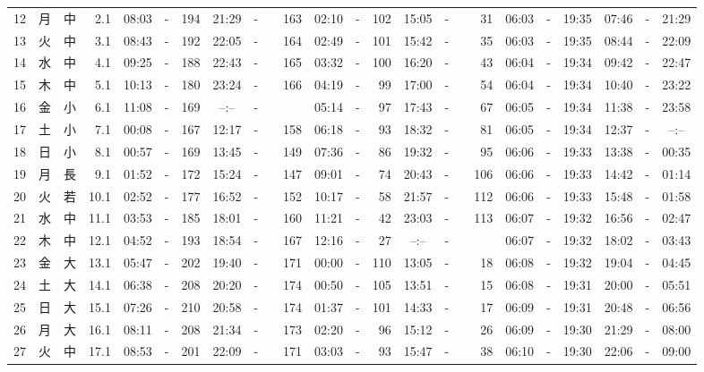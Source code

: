 \documentclass[12pt,a4j]{jsarticle}
\begin{document}
\begin{table}[htbp]
\begin{center}
{\begin{tabular}{|rc|cr|ccrccr|ccrccr|ccc|ccc|}
12 & 月 & 中 &  2.1 &  08:03 &-& 194 &  21:29 &-& 163 &  02:10 &-& 102 &  15:05 &-&  31 & 06:03 & -& 19:35 & 07:46 & -& 21:29 \\
13 & 火 & 中 &  3.1 &  08:43 &-& 192 &  22:05 &-& 164 &  02:49 &-& 101 &  15:42 &-&  35 & 06:03 & -& 19:35 & 08:44 & -& 22:09 \\
14 & 水 & 中 &  4.1 &  09:25 &-& 188 &  22:43 &-& 165 &  03:32 &-& 100 &  16:20 &-&  43 & 06:04 & -& 19:34 & 09:42 & -& 22:47 \\
15 & 木 & 中 &  5.1 &  10:13 &-& 180 &  23:24 &-& 166 &  04:19 &-&  99 &  17:00 &-&  54 & 06:04 & -& 19:34 & 10:40 & -& 23:22 \\
16 & 金 & 小 &  6.1 &  11:08 &-& 169 &  --:-- &-&~~~~~ &  05:14 &-&  97 &  17:43 &-&  67 & 06:05 & -& 19:34 & 11:38 & -& 23:58 \\
17 & 土 & 小 &  7.1 &  00:08 &-& 167 &  12:17 &-& 158 &  06:18 &-&  93 &  18:32 &-&  81 & 06:05 & -& 19:34 & 12:37 & -& --:-- \\
18 & 日 & 小 &  8.1 &  00:57 &-& 169 &  13:45 &-& 149 &  07:36 &-&  86 &  19:32 &-&  95 & 06:06 & -& 19:33 & 13:38 & -& 00:35 \\
19 & 月 & 長 &  9.1 &  01:52 &-& 172 &  15:24 &-& 147 &  09:01 &-&  74 &  20:43 &-& 106 & 06:06 & -& 19:33 & 14:42 & -& 01:14 \\
20 & 火 & 若 & 10.1 &  02:52 &-& 177 &  16:52 &-& 152 &  10:17 &-&  58 &  21:57 &-& 112 & 06:06 & -& 19:33 & 15:48 & -& 01:58 \\
21 & 水 & 中 & 11.1 &  03:53 &-& 185 &  18:01 &-& 160 &  11:21 &-&  42 &  23:03 &-& 113 & 06:07 & -& 19:32 & 16:56 & -& 02:47 \\
22 & 木 & 中 & 12.1 &  04:52 &-& 193 &  18:54 &-& 167 &  12:16 &-&  27 &  --:-- &-&~~~~~ & 06:07 & -& 19:32 & 18:02 & -& 03:43 \\
23 & 金 & 大 & 13.1 &  05:47 &-& 202 &  19:40 &-& 171 &  00:00 &-& 110 &  13:05 &-&  18 & 06:08 & -& 19:32 & 19:04 & -& 04:45 \\
24 & 土 & 大 & 14.1 &  06:38 &-& 208 &  20:20 &-& 174 &  00:50 &-& 105 &  13:51 &-&  15 & 06:08 & -& 19:31 & 20:00 & -& 05:51 \\
25 & 日 & 大 & 15.1 &  07:26 &-& 210 &  20:58 &-& 174 &  01:37 &-& 101 &  14:33 &-&  17 & 06:09 & -& 19:31 & 20:48 & -& 06:56 \\
26 & 月 & 大 & 16.1 &  08:11 &-& 208 &  21:34 &-& 173 &  02:20 &-&  96 &  15:12 &-&  26 & 06:09 & -& 19:30 & 21:29 & -& 08:00 \\
27 & 火 & 中 & 17.1 &  08:53 &-& 201 &  22:09 &-& 171 &  03:03 &-&  93 &  15:47 &-&  38 & 06:10 & -& 19:30 & 22:06 & -& 09:00 \\

\end{tabular}}
\end{center}
\end{table}
\end{document}
